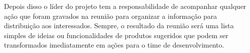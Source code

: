 	Depois disso o líder do projeto tem a responsabilidade de acompanhar qualquer ação que foram gravados 
	na reunião para organizar a informação para distribuição aos interessados. 
	Sempre, o resultado da reunião será uma lista simples de ideias ou funcionalidades de produtos 
	sugeridos que podem ser transformados imediatamente em ações para o time de desenvolvimento.
      
      


    


 
    
